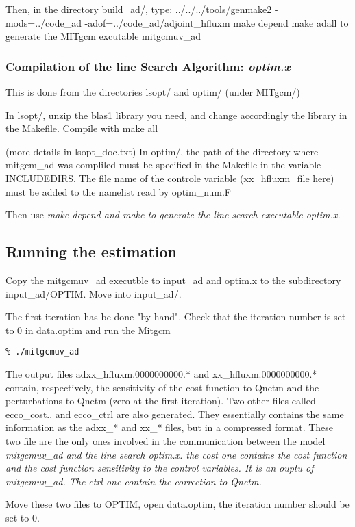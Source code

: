 Then, in the directory build\_ad/, type:
../../../tools/genmake2 -mods=../code\_ad -adof=../code\_ad/adjoint\_hfluxm
make depend
make adall
to generate the MITgcm excutable mitgcmuv\_ad


\subsubsection{Compilation of the line Search Algorithm: \it{optim.x}}

This is done from the directories lsopt/ and optim/ (under MITgcm/)

In lsopt/, unzip the blas1 library you need, and change accordingly the
library in the Makefile. Compile with make all

(more details in lsopt\_doc.txt)
In optim/,  the path of the directory where mitgcm\_ad was compliled must be specified
in the Makefile in the variable INCLUDEDIRS. The file name of the controle variable
(xx\_hfluxm\_file here) must be added to the namelist read by optim\_num.F

Then use \it{make depend} and \it{make} to generate the line-search executable \it{optim.x}.

\subsection{Running the estimation}

Copy the mitgcmuv\_ad executble to input\_ad and optim.x to the subdirectory
input\_ad/OPTIM. Move into input\_ad/.

The first iteration has be done "by hand". Check that the iteration number is set
to 0 in data.optim and run the Mitgcm
\begin{verbatim}
% ./mitgcmuv_ad
\end{verbatim}

The output files adxx\_hfluxm.0000000000.* and xx\_hfluxm.0000000000.* contain,
respectively, the sensitivity of the cost function to Qnetm and the perturbations
to Qnetm (zero at the first iteration). Two other files called ecco\_cost.. and
ecco\_ctrl are also generated. They essentially contains the same information as the
adxx\_* and xx\_* files, but in a compressed format. These two file are the only ones
involved in the communication between the model \it{mitgcmuv\_ad} and the line search optim.x. the cost one contains the cost function and the cost function
sensitivity to the control variables. It is an ouptu of mitgcmuv\_ad. The ctrl one contain the correction to Qnetm.

Move these two files to OPTIM, open data.optim, the iteration number should be
set to 0. 
